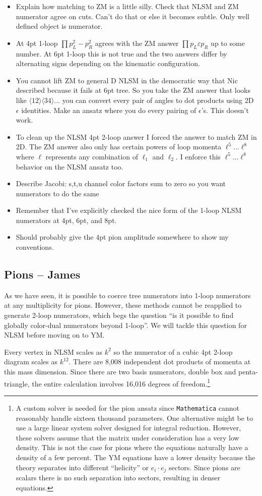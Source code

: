 \documentclass[11pt,letter]{article}
\def\eps{\varepsilon}
\begin{document}
\begin{itemize}
\item Explain how matching to ZM is a little silly.
Check that NLSM and ZM numerator agree on cuts.
Can't do that or else it becomes subtle.
Only well defined object is numerator.
\item At 4pt 1-loop $\prod p_L^2 -p_R^2$ agrees with the ZM answer $\prod p_L \eps p_R$ up to some number.
At 6pt 1-loop this is not true and the two answers differ by alternating signs depending on the kinematic configuration.
\item You cannot lift ZM to general D NLSM in the democratic way that Nic described because it fails at 6pt tree.  So you take the ZM answer that looks like $\langle 1 2\rangle \langle 3 4\rangle...$ you can convert every pair of angles to dot products using 2D $\epsilon$ identities.  Make an ansatz where you do every pairing of $\epsilon$'s.  This doesn't work.
\item To clean up the NLSM 4pt 2-loop answer I forced the answer to match ZM in 2D.
The ZM answer also only has certain powers of loop momenta $\ell^5$...$\ell^8$ where $\ell$ represents any combination of $\ell_1$ and $\ell_2$.
I enforce this $\ell^5$...$\ell^8$ behavior on the NLSM ansatz too.
\item Describe Jacobi:  s,t,u channel color factors sum to zero so you want numerators to do the same
\item Remember that I've explicitly checked the nice form of the 1-loop NLSM numerators at 4pt, 6pt, and 8pt.
\item Should probably give the 4pt pion amplitude somewhere to show my conventions.
\end{itemize}

\subsection{Pions -- James}
\label{sec:pions}

As we have seen, it is possible to coerce tree numerators into 1-loop numerators at any multiplicity for pions.
However, these methods cannot be reapplied to generate 2-loop numerators, which begs the question ``is it possible to find globally color-dual numerators beyond 1-loop''.
We will tackle this question for NLSM before moving on to YM.

Every vertex in NLSM scales as $k^2$ so the numerator of a cubic 4pt 2-loop diagram scales as $k^{12}$.
There are 8,008 independent dot products of momenta at this mass dimension.
Since there are two basis numerators, double box and penta-triangle, the entire calculation involves 16,016 degrees of freedom.\footnote{A custom solver is needed for the pion ansatz since \texttt{Mathematica} cannot reasonably handle sixteen thousand parameters.  One alternative might be to use a large linear system solver designed for integral reduction.  However, these solvers assume that the matrix under consideration has a very low density.  This is not the case for pions where the equations naturally have a density of a few percent.  The YM equations have a lower density because the theory separates into different ``helicity'' or $e_i\cdot e_j$ sectors.  Since pions are scalars there is no such separation into sectors, resulting in denser equations.}
\end{document}
